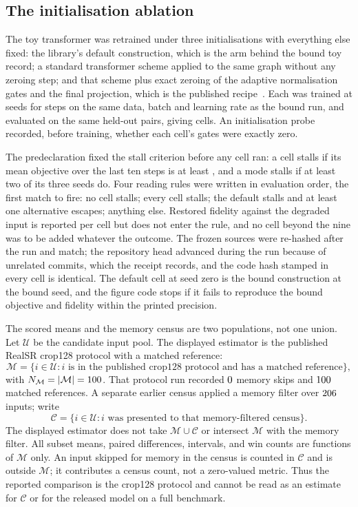 \subsection{The initialisation ablation}

The toy transformer was retrained under three initialisations with everything
else fixed: the library's default construction, which is the arm behind the
bound toy record; a standard transformer scheme applied to the same graph
without any zeroing step; and that scheme plus exact zeroing of the adaptive
normalisation gates and the final projection, which is the published
recipe~\cite{peebles2023dit}. Each was trained at \InitSeeds{} seeds for
\InitSteps{} steps on the same data, batch and learning rate as the bound run,
and evaluated on the same \ToyN{} held-out pairs, giving \InitCells{} cells. An
initialisation probe recorded, before training, whether each cell's gates were
exactly zero.

The predeclaration fixed the stall criterion before any cell ran: a cell
stalls if its mean objective over the last ten steps is at least
\InitThreshold{}, and a mode stalls if at least two of its three seeds do. Four
reading rules were written in evaluation order, the first match to fire: no
cell stalls; every cell stalls; the default stalls and at least one alternative
escapes; anything else. Restored fidelity against the degraded input is
reported per cell but does not enter the rule, and no cell beyond the nine was
to be added whatever the outcome. The frozen sources were re-hashed after the
run and match; the repository head advanced during the run because of
unrelated commits, which the receipt records, and the code hash stamped in
every cell is identical. The default cell at seed zero is the bound
construction at the bound seed, and the figure code stops if it fails to
reproduce the bound objective and fidelity within the printed precision.

The scored means and the memory census are two populations, not one union. Let
\(\mathcal{U}\) be the candidate input pool. The displayed estimator is the
published RealSR crop128 protocol with a matched reference:
\[
  \mathcal{M}
  = \{i\in\mathcal{U}: i\text{ is in the published crop128 protocol and
      has a matched reference}\},
\]
with \(N_{\mathcal{M}}=|\mathcal{M}|=100{}\). That protocol run recorded
\(0{}\) memory skips and \(100{}\) matched references. A
separate earlier census applied a memory filter over \(206{}\) inputs;
write
\[
  \mathcal{C}
  = \{i\in\mathcal{U}: i\text{ was presented to that memory-filtered
      census}\}.
\]
The displayed estimator does not take \(\mathcal{M}\cup\mathcal{C}\) or
intersect \(\mathcal{M}\) with the memory filter. All subset means, paired
differences, intervals, and win counts are functions of \(\mathcal{M}\) only.
An input skipped for memory in the census is counted in \(\mathcal{C}\) and is
outside \(\mathcal{M}\); it contributes a census count, not a zero-valued
metric. Thus the reported comparison is the crop128 protocol and cannot be
read as an estimate for \(\mathcal{C}\) or for the released model on a full
benchmark.

